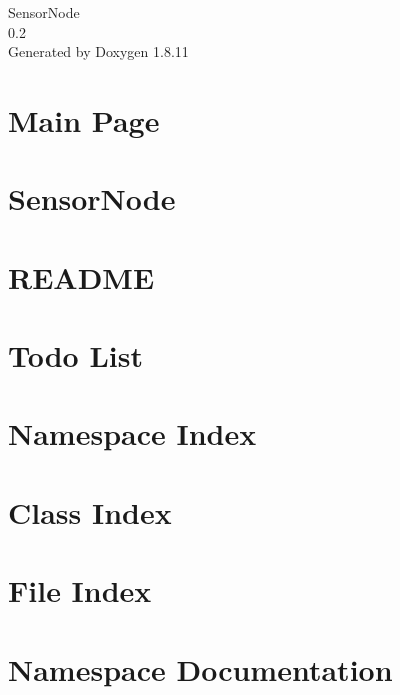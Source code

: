 \documentclass[twoside]{book}
\newcommand{\+}{\discretionary{\mbox{\scriptsize$\hookleftarrow$}}{}{}}
\newcommand{\clearemptydoublepage}{%
  \newpage{\pagestyle{empty}\cleardoublepage}%
}
\begin{document}
\hypersetup{pageanchor=false,
             bookmarksnumbered=true,
             pdfencoding=unicode
            }
\begin{titlepage}
\vspace*{7cm}
\begin{center}%
{\Large Sensor\+Node \\[1ex]\large 0.\+2 }\\
\vspace*{1cm}
{\large Generated by Doxygen 1.8.11}\\
\end{center}
\end{titlepage}
\clearemptydoublepage
\tableofcontents
\clearemptydoublepage
{}
\hypersetup{pageanchor=true}

\chapter{Main Page}
\label{index}\hypertarget{index}{}
\chapter{Sensor\+Node}
\label{md_src_README}
\hypertarget{md_src_README}{}

\chapter{R\+E\+A\+D\+ME}
\label{md_Python_README}
\hypertarget{md_Python_README}{}

\chapter{Todo List}
\label{todo}
\hypertarget{todo}{}

\chapter{Namespace Index}

\chapter{Class Index}

\chapter{File Index}

\chapter{Namespace Documentation}






\end{document}
